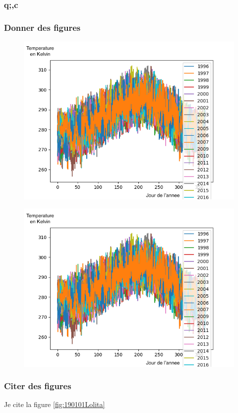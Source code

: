 \documentclass[11pt,a4paper]{article}
\begin{document}
\subsubsection{q;,c}
\subsubsection{Donner des figures}

\begin{figure}
  \includegraphics[width=0.48 \textwidth]{./imagesTIPE/temperature.png}\quad
\end{figure}
\begin{figure}
  \includegraphics[width=0.48 \textwidth]{./imagesTIPE/temperature.png}\quad
\end{figure}

\subsubsection{Citer des figures}
Je cite la figure \ref{fig:190101Lolita}
\end{document}
